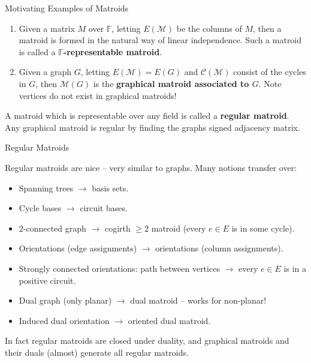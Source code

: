 \documentclass[9pt]{beamer}
\def\calM{\mathcal M}
\def\calC{\mathcal C}
\begin{document}
    \begin{frame}{Motivating Examples of Matroids}

        \begin{enumerate}
            \item Given a matrix $M$ over $\mathbb{F}$, letting $E(\calM)$ be the columns of $M$, then a matroid is formed in the natural way of linear independence.
            Such a matroid is called a \textbf{$\mathbb{F}$-representable matroid}.\pause
            \item Given a graph $G$, letting $E(\calM)=E(G)$ and $\calC(\calM)$ consist of the cycles in $G$, then $\calM(G)$ is the \textbf{graphical matroid associated to $G$}.
            Note vertices do not exist in graphical matroids!\pause
        \end{enumerate}

        A matroid which is representable over any field is called a \textbf{regular matroid}.
        Any graphical matroid is regular by finding the graphs signed adjacency matrix.
        
    \end{frame}

    \begin{frame}{Regular Matroids}

        Regular matroids are nice -- very similar to graphs.
        Many notions transfer over:\pause

        \begin{itemize}
            \item Spanning trees $\rightarrow$ basis sets.\pause
            \item Cycle bases $\rightarrow$ circuit bases.\pause
            \item $2$-connected graph $\rightarrow$ cogirth $\geq2$ matroid (every $e\in E$ is in some cycle).\pause
            \item Orientations (edge assignments) $\rightarrow$ orientations (column assignments).\pause
            \item Strongly connected orientations: path between vertices $\rightarrow$ every $e\in E$ is in a positive circuit.\pause
            \item Dual graph (only planar) $\rightarrow$ dual matroid -- works for non-planar!\pause
            \item Induced dual orientation $\rightarrow$ oriented dual matroid.\pause
        \end{itemize}
        In fact regular matroids are closed under duality, and graphical matroids and their duals (almost) generate all regular matroids.
        
    \end{frame}
\end{document}
